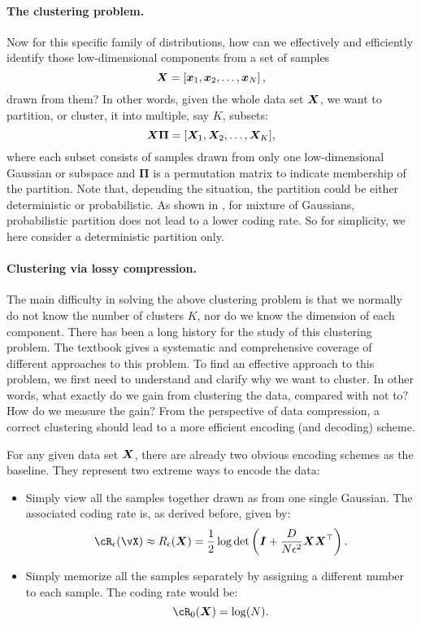 \documentclass[../../book-main.tex]{subfiles}
\begin{document}
\paragraph{The clustering problem.}
Now for this specific family of distributions, how can we effectively and efficiently identify those low-dimensional components from a set of samples
\begin{equation}
	\bm{X} = \left[\bm{x}_1, \bm{x}_2, \ldots, \bm{x}_N\right],
\end{equation}
drawn from them? In other words, given the whole data set $\bm{X}$, we want to partition, or cluster, it into multiple, say $K$, subsets:
\begin{equation}
	\bm{X}\bm \Pi = [\bm{X}_1, \bm{X}_2, \dots, \bm{X}_K],
\end{equation}
where each subset consists of samples drawn from only one low-dimensional Gaussian or subspace and $\bm \Pi$ is a permutation matrix to indicate membership of the partition. Note that, depending the situation, the partition could be either deterministic or probabilistic. As shown in \cite{ma2007segmentation}, for mixture of Gaussians, probabilistic partition does not lead to a lower coding rate. So for simplicity, we here consider a deterministic partition only.

\paragraph{Clustering via lossy compression.}
The main difficulty in solving the above clustering problem is that we normally do not know the number of clusters $K$, nor do we know the dimension of each component. There has been a long history for the study of this clustering problem. The textbook \cite{GPCA} gives a systematic and comprehensive coverage of different approaches to this problem. To find an effective approach to this problem, we first need to understand and clarify why we want to cluster. In other words, what exactly do we gain from clustering the data, compared with not to? How do we measure the gain? From the perspective of data compression, a correct clustering should lead to a more efficient encoding (and decoding) scheme.

For any given data set $\bm{X}$, there are already two obvious encoding schemes as the baseline. They represent two extreme ways to encode the data:
\begin{itemize}
	\item Simply view all the samples together drawn as from one single Gaussian. The associated coding rate is, as derived before, given by:
	      \begin{equation}
		      \cR_{\epsilon}(\vX) \approx R_{\epsilon}(\X) = \frac{1}{2} \log \det \left(\boldsymbol{I} + \frac{D}{N\epsilon^2} \X\X^\top \right).
	      \end{equation}
	\item Simply memorize all the samples separately by assigning a different number to each sample. The coding rate would be:
	      \begin{equation}
		      \cR_0(\X) = \log(N).
	      \end{equation}
\end{itemize}
\end{document}
